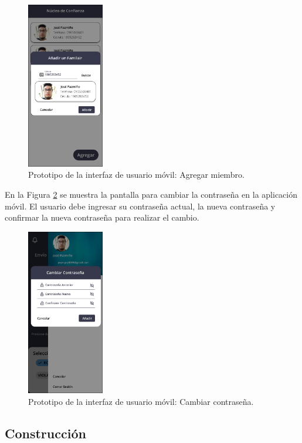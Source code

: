\begin{figure}[H]
    \centering
    \includegraphics[width=0.3\textwidth]{chapters/III-resultados-y-discusion/resources/images/prototipo-agregar-miembro-mobile.png}
    \caption{Prototipo de la interfaz de usuario móvil: Agregar miembro.}
    \label{fig:prototipo-agregar-miembro-mobile}
\end{figure}

En la Figura \ref{fig:prototipo-cambiar-contrasena-mobile} se muestra la pantalla para cambiar la contraseña en la aplicación móvil. El usuario
debe ingresar su contraseña actual, la nueva contraseña y confirmar la nueva contraseña para realizar el cambio.

\begin{figure}[H]
    \centering
    \includegraphics[width=0.3\textwidth]{chapters/III-resultados-y-discusion/resources/images/prototipo-cambiar-contrasena-mobile.png}
    \caption{Prototipo de la interfaz de usuario móvil: Cambiar contraseña.}
    \label{fig:prototipo-cambiar-contrasena-mobile}
\end{figure}

\subsection{Construcción}

